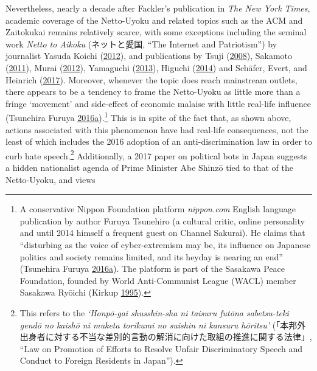 \documentclass[10pt,british,A4paper,oneside]{memoir}
\begin{document}
Nevertheless, nearly a decade after Fackler's publication in \emph{The
New York Times}, academic coverage of the Netto-Uyoku and related topics
such as the ACM and Zaitokukai remains relatively scarce, with some
exceptions including the seminal work \emph{Netto to Aikoku}
(ネットと愛国, ``The Internet and Patriotism'') by journalist Yasuda
Koichi (\protect\hyperlink{ref-yasuda_eng:_2012}{2012}), and publications by
Tsuji (\protect\hyperlink{ref-tsuji_eng:_2008}{2008}), Sakamoto
(\protect\hyperlink{ref-sakamoto_koreans_2011}{2011}), Murai
(\protect\hyperlink{ref-murai_net_2012}{2012}), Yamaguchi
(\protect\hyperlink{ref-yamaguchi_xenophobia_2013}{2013}), Higuchi
(\protect\hyperlink{ref-higuchi_japans_2014}{2014}) and Schäfer, Evert,
and Heinrich (\protect\hyperlink{ref-schafer_japans_2017}{2017}).
Moreover, whenever the topic does reach mainstream outlets, there
appears to be a tendency to frame the Netto-Uyoku as little more than a
fringe `movement' and side-effect of economic malaise with little
real-life influence (Tsunehira Furuya
\protect\hyperlink{ref-furuya_roots_2016}{2016}\protect\hyperlink{ref-furuya_roots_2016}{a}).\footnote{A
  conservative Nippon Foundation platform \emph{nippon.com} English
  language publication by author Furuya Tsunehiro (a cultural critic,
  online personality and until 2014 himself a frequent guest on Channel
  Sakurai). He claims that ``disturbing as the voice of cyber-extremism
  may be, its influence on Japanese politics and society remains
  limited, and its heyday is nearing an end'' (Tsunehira Furuya
  \protect\hyperlink{ref-furuya_roots_2016}{2016}\protect\hyperlink{ref-furuya_roots_2016}{a}).
  The platform is part of the Sasakawa Peace Foundation, founded by
  World Anti-Communist League (WACL) member Sasakawa Ryōichi (Kirkup
  \protect\hyperlink{ref-kirkup_obituary:_1995}{1995}).} This is in
spite of the fact that, as shown above, actions associated with this
phenomenon have had real-life consequences, not the least of which
includes the 2016 adoption of an anti-discrimination law in order to
curb hate speech.\footnote{This refers to the \emph{`Honpō-gai shusshin-sha ni taisuru
  futōna sabetsu-teki gendō no kaishō ni muketa torikumi no suishin ni
  kansuru
  hōritsu'} (「本邦外出身者に対する不当な差別的言動の解消に向けた取組の推進に関する法律」,
  ``Law on Promotion of Efforts to Resolve Unfair Discriminatory Speech
  and Conduct to Foreign Residents in Japan'').} Additionally, a 2017
paper on political bots in Japan suggests a hidden nationalist agenda of
Prime Minister Abe Shinzō tied to that of the Netto-Uyoku, and views
\end{document}
